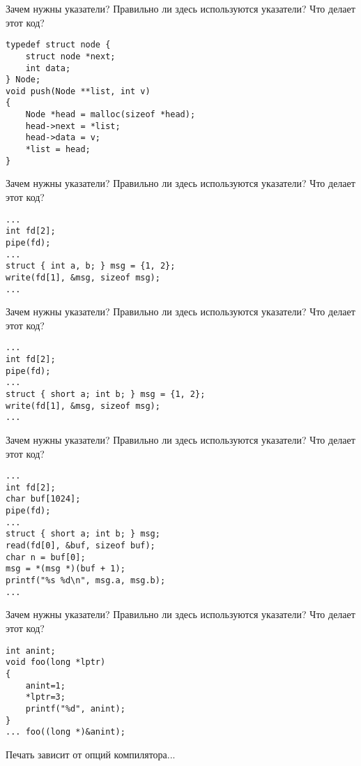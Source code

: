 \documentclass[hyperref={unicode=true}]{beamer}
\begin{document}
    \begin{frame}[fragile]{Зачем нужны указатели?}
    Правильно ли здесь используются указатели?
    Что делает этот код?
    \begin{lstlisting}
typedef struct node {
    struct node *next;
    int data;
} Node;
void push(Node **list, int v)
{
    Node *head = malloc(sizeof *head);
    head->next = *list;
    head->data = v;
    *list = head;
}
    \end{lstlisting}
    \end{frame}

    \begin{frame}[fragile]{Зачем нужны указатели?}
    Правильно ли здесь используются указатели?
    Что делает этот код?
    \begin{lstlisting}
...
int fd[2];
pipe(fd);
...
struct { int a, b; } msg = {1, 2};
write(fd[1], &msg, sizeof msg);
...
    \end{lstlisting}
    \end{frame}
\iffalse
    \begin{frame}[fragile]{Зачем нужны указатели?}
    Правильно ли здесь используются указатели?
    Что делает этот код?
    \begin{lstlisting}
...
int fd[2];
pipe(fd);
...
struct { short a; int b; } msg = {1, 2};
write(fd[1], &msg, sizeof msg);
...
    \end{lstlisting}
    \end{frame}

    \begin{frame}[fragile]{Зачем нужны указатели?}
    Правильно ли здесь используются указатели?
    Что делает этот код?
    \begin{lstlisting}
...
int fd[2];
char buf[1024];
pipe(fd);
...
struct { short a; int b; } msg;
read(fd[0], &buf, sizeof buf);
char n = buf[0];
msg = *(msg *)(buf + 1);
printf("%s %d\n", msg.a, msg.b);
...
    \end{lstlisting}
    \end{frame}

    \begin{frame}[fragile]{Зачем нужны указатели?}
    Правильно ли здесь используются указатели?
    Что делает этот код?
    \begin{lstlisting}
int anint;
void foo(long *lptr)
{
    anint=1;
    *lptr=3;
    printf("%d", anint);
}
... foo((long *)&anint);
    \end{lstlisting}
Печать зависит от опций компилятора...
    \end{frame}
\end{document}
